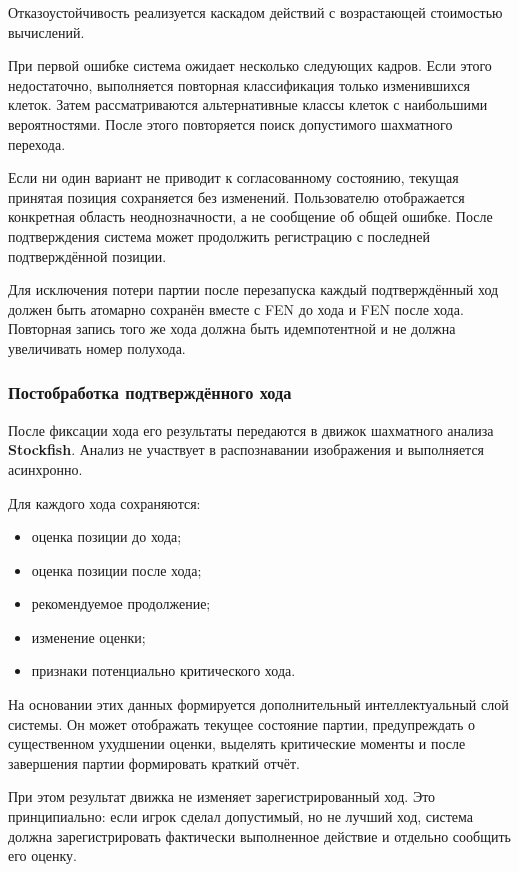 Отказоустойчивость реализуется каскадом действий с возрастающей стоимостью вычислений.

При первой ошибке система ожидает несколько следующих кадров. Если этого недостаточно, выполняется повторная классификация только изменившихся клеток. Затем рассматриваются альтернативные классы клеток с наибольшими вероятностями. После этого повторяется поиск допустимого шахматного перехода.

Если ни один вариант не приводит к согласованному состоянию, текущая принятая позиция сохраняется без изменений. Пользователю отображается конкретная область неоднозначности, а не сообщение об общей ошибке. После подтверждения система может продолжить регистрацию с последней подтверждённой позиции.

Для исключения потери партии после перезапуска каждый подтверждённый ход должен быть атомарно сохранён вместе с FEN до хода и FEN после хода. Повторная запись того же хода должна быть идемпотентной и не должна увеличивать номер полухода.

\subsubsection{Постобработка подтверждённого хода}

После фиксации хода его результаты передаются в движок шахматного анализа \textbf{Stockfish}. Анализ не участвует в распознавании изображения и выполняется асинхронно.

Для каждого хода сохраняются:

\begin{itemize}
    \item оценка позиции до хода;
    \item оценка позиции после хода;
    \item рекомендуемое продолжение;
    \item изменение оценки;
    \item признаки потенциально критического хода.
\end{itemize}

На основании этих данных формируется дополнительный интеллектуальный слой системы. Он может отображать текущее состояние партии, предупреждать о существенном ухудшении оценки, выделять критические моменты и после завершения партии формировать краткий отчёт.

При этом результат движка не изменяет зарегистрированный ход. Это принципиально: если игрок сделал допустимый, но не лучший ход, система должна зарегистрировать фактически выполненное действие и отдельно сообщить его оценку.

